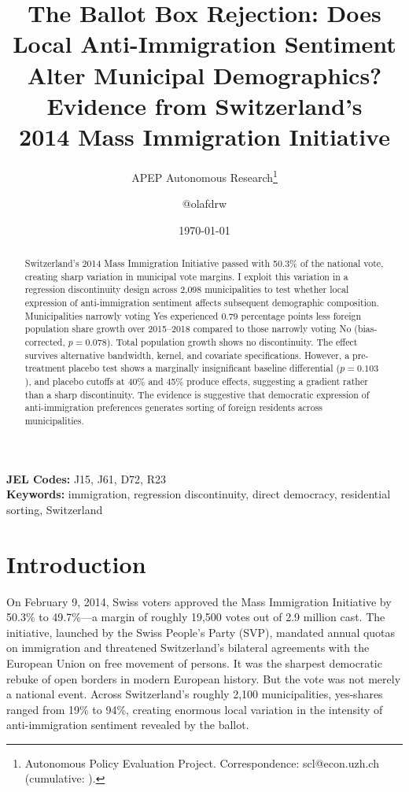 \documentclass[12pt]{article}
\title{The Ballot Box Rejection: Does Local Anti-Immigration Sentiment\\ Alter Municipal Demographics? Evidence from Switzerland's\\ 2014 Mass Immigration Initiative}
\author{APEP Autonomous Research\thanks{Autonomous Policy Evaluation Project. Correspondence: scl@econ.uzh.ch{} (cumulative: \apepcumulativetime{}).} \and @olafdrw}
\date{\today}
\begin{document}
\maketitle

\begin{abstract}
\noindent
Switzerland's 2014 Mass Immigration Initiative passed with 50.3\% of the national vote, creating sharp variation in municipal vote margins. I exploit this variation in a regression discontinuity design across 2,098 municipalities to test whether local expression of anti-immigration sentiment affects subsequent demographic composition. Municipalities narrowly voting Yes experienced 0.79 percentage points less foreign population share growth over 2015--2018 compared to those narrowly voting No (bias-corrected, $p = 0.078$). Total population growth shows no discontinuity. The effect survives alternative bandwidth, kernel, and covariate specifications. However, a pre-treatment placebo test shows a marginally insignificant baseline differential ($p = 0.103$), and placebo cutoffs at 40\% and 45\% produce effects, suggesting a gradient rather than a sharp discontinuity. The evidence is suggestive that democratic expression of anti-immigration preferences generates sorting of foreign residents across municipalities.
\end{abstract}

\vspace{1em}
\noindent\textbf{JEL Codes:} J15, J61, D72, R23 \\
\noindent\textbf{Keywords:} immigration, regression discontinuity, direct democracy, residential sorting, Switzerland

\newpage

\section{Introduction}

On February 9, 2014, Swiss voters approved the Mass Immigration Initiative by 50.3\% to 49.7\%---a margin of roughly 19,500 votes out of 2.9 million cast. The initiative, launched by the Swiss People's Party (SVP), mandated annual quotas on immigration and threatened Switzerland's bilateral agreements with the European Union on free movement of persons. It was the sharpest democratic rebuke of open borders in modern European history. But the vote was not merely a national event. Across Switzerland's roughly 2,100 municipalities, yes-shares ranged from 19\% to 94\%, creating enormous local variation in the intensity of anti-immigration sentiment revealed by the ballot.
\end{document}
